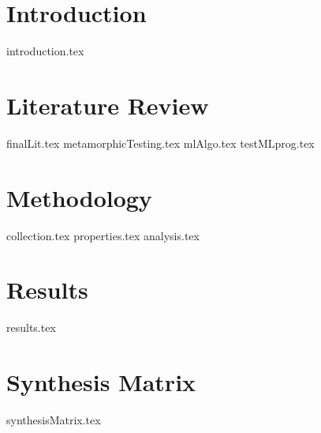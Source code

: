 \documentclass[print,ms]{unothesis}
\begin{document}
\mainmatter


\chapter{Introduction}
{introduction.tex}
% 

\chapter{Literature Review}
{finalLit.tex}
{metamorphicTesting.tex}
{mlAlgo.tex}
{testMLprog.tex}

\chapter{Methodology}
{collection.tex}
\newpage
{properties.tex}
\newpage
{analysis.tex}



\chapter{Results}
{results.tex}

\chapter{Synthesis Matrix}
{synthesisMatrix.tex}

\backmatter

\appendix



\nocite{*}


\end{document}

